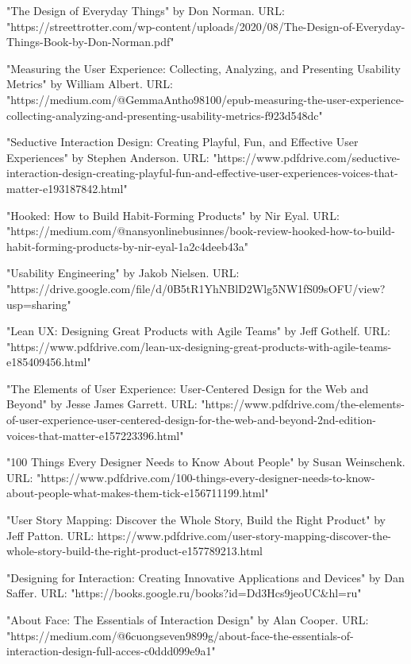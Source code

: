 \documentclass{article}
\begin{document}
"The Design of Everyday Things" by Don Norman. URL:
"https://streettrotter.com/wp-content/uploads/2020/08/The-Design-of-Everyday-Things-Book-by-Don-Norman.pdf"

"Measuring the User Experience: Collecting, Analyzing, and Presenting Usability Metrics" by William Albert. URL: "https://medium.com/@GemmaAntho98100/epub-measuring-the-user-experience-collecting-analyzing-and-presenting-usability-metrics-f923d548dc"

"Seductive Interaction Design: Creating Playful, Fun, and Effective User Experiences" by Stephen Anderson. URL: "https://www.pdfdrive.com/seductive-interaction-design-creating-playful-fun-and-effective-user-experiences-voices-that-matter-e193187842.html"

"Hooked: How to Build Habit-Forming Products" by Nir Eyal. URL: "https://medium.com/@nansyonlinebusinnes/book-review-hooked-how-to-build-habit-forming-products-by-nir-eyal-1a2c4deeb43a"

"Usability Engineering" by Jakob Nielsen. URL: "https://drive.google.com/file/d/0B5tR1YhNBlD2Wlg5NW1fS09sOFU/view?usp=sharing"

"Lean UX: Designing Great Products with Agile Teams" by Jeff Gothelf. URL:
"https://www.pdfdrive.com/lean-ux-designing-great-products-with-agile-teams-e185409456.html"

"The Elements of User Experience: User-Centered Design for the Web and Beyond" by Jesse James Garrett. URL: "https://www.pdfdrive.com/the-elements-of-user-experience-user-centered-design-for-the-web-and-beyond-2nd-edition-voices-that-matter-e157223396.html"

"100 Things Every Designer Needs to Know About People" by Susan Weinschenk. URL: "https://www.pdfdrive.com/100-things-every-designer-needs-to-know-about-people-what-makes-them-tick-e156711199.html"

"User Story Mapping: Discover the Whole Story, Build the Right Product" by Jeff Patton. URL: https://www.pdfdrive.com/user-story-mapping-discover-the-whole-story-build-the-right-product-e157789213.html

"Designing for Interaction: Creating Innovative Applications and Devices" by Dan Saffer. URL: "https://books.google.ru/books?id=Dd3Hcs9jeoUC&hl=ru"

"About Face: The Essentials of Interaction Design" by Alan Cooper. URL: "https://medium.com/@6cuongseven9899g/about-face-the-essentials-of-interaction-design-full-acces-c0ddd099e9a1"
\end{document}
